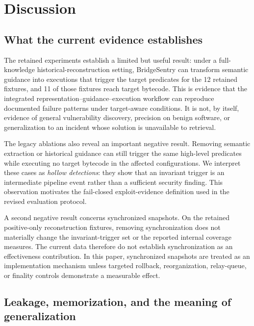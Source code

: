 
\section{Discussion}\label{sec:discussion}

\subsection{What the current evidence establishes}

The retained experiments establish a limited but useful result: under a full-knowledge historical-reconstruction setting, BridgeSentry can transform semantic guidance into executions that trigger the target predicates for the 12 retained fixtures, and 11 of those fixtures reach target bytecode. This is evidence that the integrated representation--guidance--execution workflow can reproduce documented failure patterns under target-aware conditions. It is not, by itself, evidence of general vulnerability discovery, precision on benign software, or generalization to an incident whose solution is unavailable to retrieval.

The legacy ablations also reveal an important negative result. Removing semantic extraction or historical guidance can still trigger the same high-level predicates while executing no target bytecode in the affected configurations. We interpret these cases as \emph{hollow detections}: they show that an invariant trigger is an intermediate pipeline event rather than a sufficient security finding. This observation motivates the fail-closed exploit-evidence definition used in the revised evaluation protocol.

A second negative result concerns synchronized snapshots. On the retained positive-only reconstruction fixtures, removing synchronization does not materially change the invariant-trigger set or the reported internal coverage measures. The current data therefore do not establish synchronization as an effectiveness contribution. In this paper, synchronized snapshots are treated as an implementation mechanism unless targeted rollback, reorganization, relay-queue, or finality controls demonstrate a measurable effect.

\subsection{Leakage, memorization, and the meaning of generalization}

